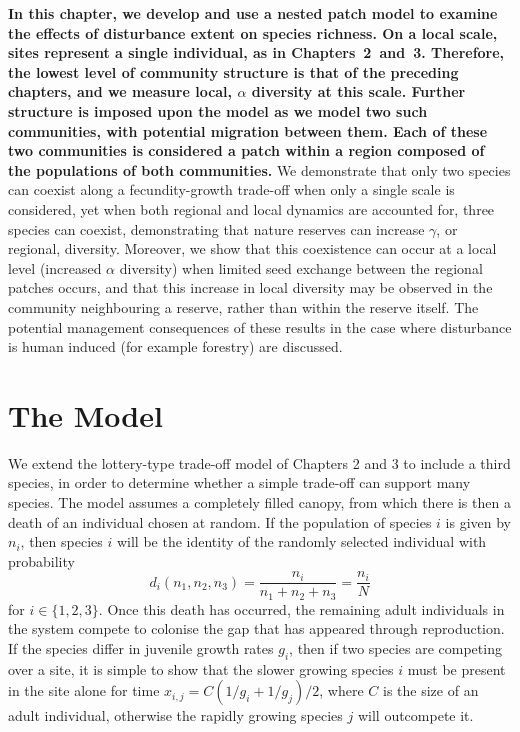 \textbf{In this chapter, we develop and use a nested patch model to examine the effects of disturbance extent on species richness. On a local scale, sites represent a single individual, as in Chapters~2~and~3. Therefore, the lowest level of community structure is that of the preceding chapters, and we measure local, $\alpha$ diversity at this scale. Further structure is imposed upon the model as we model two such communities, with potential migration between them. Each of these two communities is considered a patch within a region composed of the populations of both communities.} We demonstrate that only two species can coexist along a fecundity-growth trade-off when only a single scale is considered, yet when both regional and local dynamics are accounted for, three species can coexist, demonstrating that nature reserves can increase $\gamma$, or regional, diversity. Moreover, we show that this coexistence can occur at a local level (increased $\alpha$ diversity) when limited seed exchange between the regional patches occurs, and that this increase in local diversity may be observed in the community neighbouring a reserve, rather than within the reserve itself. The potential management consequences of these results in the case where disturbance is human induced (for example forestry) are discussed.



\section{The Model}
We extend the lottery-type trade-off model of Chapters 2 and 3 to include a third species, in order to determine whether a simple trade-off can support many species. The model assumes a completely filled canopy, from which there is then a death of an individual chosen at random. If the population of species $i$ is given by $n_i$, then species $i$ will be the identity of the randomly selected individual with probability
\begin{equation}
\label{d}
d_i(n_1,n_2,n_3)=\frac{n_i}{n_1+n_2+n_3}=\frac{n_i}{N} \end{equation}
for $i \in \{1,2,3\}$. Once this death has occurred, the remaining adult individuals in the system compete to colonise the gap that has appeared through reproduction. If the species differ in juvenile growth rates $g_i$, then if two species are competing over a site, it is simple to show that the slower growing species $i$ must be present in the site alone for time $x_{i,j}=C(1/g_i +1/g_j)/2$, where $C$ is the size of an adult individual, otherwise the rapidly growing species $j$ will outcompete it.

